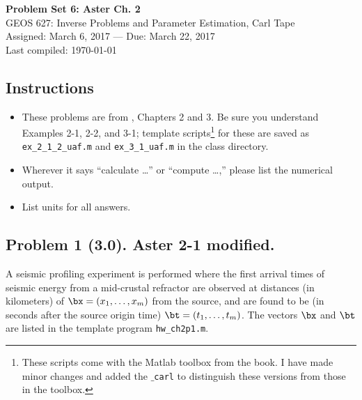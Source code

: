 \documentclass[11pt,titlepage,fleqn]{article}
\begin{document}

\begin{spacing}{1.2}
\centering
{\large \bf Problem Set 6: Aster Ch. 2} \\
GEOS 627: Inverse Problems and Parameter Estimation, Carl Tape \\
Assigned: March 6, 2017 --- Due: March 22, 2017 \\
Last compiled: \today
\end{spacing}


\subsection*{Instructions}

\begin{itemize}
\item These problems are from \citet{AsterE2}, Chapters 2 and 3. Be sure you understand Examples 2-1, 2-2, and 3-1; template scripts\footnote{These scripts come with the Matlab toolbox from the book. I have made minor changes and added the {\tt $\_$carl} to distinguish these versions from those in the toolbox.}  for these are saved as \verb+ex_2_1_2_uaf.m+ and \verb+ex_3_1_uaf.m+ in the class directory.
\item Wherever it says ``calculate \ldots'' or ``compute \ldots,'' please list the numerical output.
\item List units for all answers.
\end{itemize}

\subsection*{Problem 1 (3.0). Aster 2-1 modified.}

A seismic profiling experiment is performed where the first arrival times of seismic energy from a mid-crustal refractor are observed at distances (in kilometers) of $\bx = (x_1, \ldots, x_m)$ from the source, and are found to be (in seconds after the source origin time) $\bt = (t_1, \ldots, t_m)$. The vectors $\bx$ and $\bt$ are listed in the template program \verb+hw_ch2p1.m+.
\end{document}
